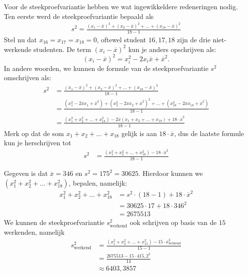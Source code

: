 \begin{enumerate}[label=(\alph*)]
{        Voor de steekproefvariantie hebben we wat ingewikkeldere redeneringen nodig.
        Ten eerste werd de steekproefvariantie bepaald als
        \begin{align*}
            s^2 = \frac{(x_1-\overline{x})^2+(x_2-\overline{x})^2+\ldots+(x_{18}-\overline{x})^2}{18-1}
        \end{align*}
        Stel nu dat $x_{16} = x_{17} = x_{18} = 0$, oftewel student $16, 17, 18$ zijn de drie niet-werkende studenten.
        De term $(x_i - \overline{x})^2$ kun je anders opschrijven als:
        \[
            (x_i - \overline{x})^2 = x_i^2 - 2x_i\overline{x} + \overline{x}^2.
        \]
        In andere woorden, we kunnen de formule van de steekproefvariantie $s^2$ omschrijven als:
        \begin{align*}
            s^2 &= \frac{(x_1-\overline{x})^2+(x_2-\overline{x})^2+\ldots+(x_{18}-\overline{x})^2}{18-1} \\
                &= \frac{(x_1^2-2\overline{x}x_1 + \overline{x}^2)+(x_2^2-2\overline{x}x_2 + \overline{x}^2)^2+\ldots+(x_{18}^2-2\overline{x}x_{18} + \overline{x}^2)}{18-1} \\
                &= \frac{(x_1^2 + x_2^2 +\ldots + x_{18}^2) -2\overline{x}(x_1 + x_2 + \ldots + x_{18}) + 18 \cdot \overline{x}^2}{18-1}
        \end{align*}
        Merk op dat de som $x_1 + x_2 + \ldots + x_{18}$ gelijk is aan $18 \cdot \overline{x}$, dus de laatste formule kun je herschrijven tot
        \begin{align*}
            s^2 &= \frac{(x_1^2 + x_2^2 +\ldots + x_{18}^2) - 18 \cdot \overline{x}^2}{18-1}
        \end{align*}

        Gegeven is dat $\overline{x}=346$ en $s^2 = 175^2 = 30625$.
        Hierdoor kunnen we $(x_1^2 + x_2^2 +\ldots + x_{18}^2)$, bepalen, namelijk:
        \begin{align*}
            x_1^2 + x_2^2 +\ldots + x_{18}^2    &= s^2 \cdot (18 - 1) + 18 \cdot \overline{x}^2 \\
                                                &= 30625 \cdot 17 + 18 \cdot 346^2 \\
                                                &= 2675513
        \end{align*}
        We kunnen de steekproefvariantie $s_{\text{werkend}}^2$ ook schrijven op basis van de $15$ werkenden, namelijk
        \begin{align*}
            s_{\text{werkend}}^2 &= \frac{(x_1^2 + x_2^2 +\ldots + x_{15}^2) - 15 \cdot \overline{x}_{\text{werkend}}^2}{15-1} \\
                &= \frac{2675513 - 15 \cdot 415,2^2}{14} \\
                &\approx 6403,3857
        \end{align*}

}
\end{enumerate}
